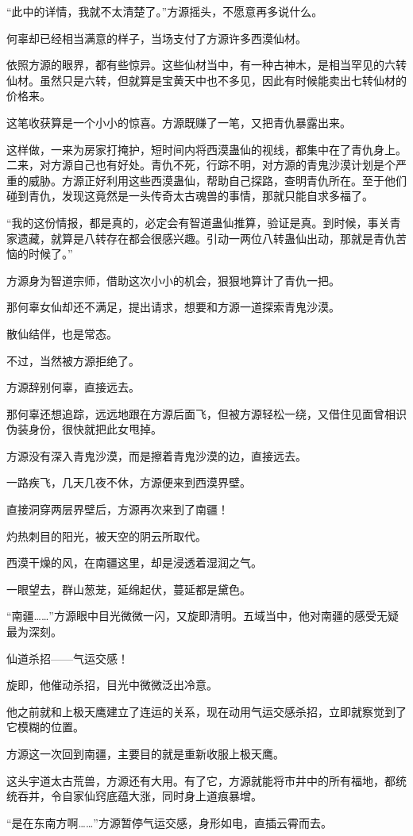 \begin{this_body}
“此中的详情，我就不太清楚了。”方源摇头，不愿意再多说什么。

何辜却已经相当满意的样子，当场支付了方源许多西漠仙材。

依照方源的眼界，都有些惊异。这些仙材当中，有一种古神木，是相当罕见的六转仙材。虽然只是六转，但就算是宝黄天中也不多见，因此有时候能卖出七转仙材的价格来。

这笔收获算是一个小小的惊喜。方源既赚了一笔，又把青仇暴露出来。

这样做，一来为房家打掩护，短时间内将西漠蛊仙的视线，都集中在了青仇身上。二来，对方源自己也有好处。青仇不死，行踪不明，对方源的青鬼沙漠计划是个严重的威胁。方源正好利用这些西漠蛊仙，帮助自己探路，查明青仇所在。至于他们碰到青仇，发现这竟然是一头传奇太古魂兽的事情，那就只能自求多福了。

“我的这份情报，都是真的，必定会有智道蛊仙推算，验证是真。到时候，事关青家遗藏，就算是八转存在都会很感兴趣。引动一两位八转蛊仙出动，那就是青仇苦恼的时候了。”

方源身为智道宗师，借助这次小小的机会，狠狠地算计了青仇一把。

那何辜女仙却还不满足，提出请求，想要和方源一道探索青鬼沙漠。

散仙结伴，也是常态。

不过，当然被方源拒绝了。

方源辞别何辜，直接远去。

那何辜还想追踪，远远地跟在方源后面飞，但被方源轻松一绕，又借住见面曾相识伪装身份，很快就把此女甩掉。

方源没有深入青鬼沙漠，而是擦着青鬼沙漠的边，直接远去。

一路疾飞，几天几夜不休，方源便来到西漠界壁。

直接洞穿两层界壁后，方源再次来到了南疆！

灼热刺目的阳光，被天空的阴云所取代。

西漠干燥的风，在南疆这里，却是浸透着湿润之气。

一眼望去，群山葱茏，延绵起伏，蔓延都是黛色。

“南疆……”方源眼中目光微微一闪，又旋即清明。五域当中，他对南疆的感受无疑最为深刻。

仙道杀招——气运交感！

旋即，他催动杀招，目光中微微泛出冷意。

他之前就和上极天鹰建立了连运的关系，现在动用气运交感杀招，立即就察觉到了它模糊的位置。

方源这一次回到南疆，主要目的就是重新收服上极天鹰。

这头宇道太古荒兽，方源还有大用。有了它，方源就能将市井中的所有福地，都统统吞并，令自家仙窍底蕴大涨，同时身上道痕暴增。

“是在东南方啊……”方源暂停气运交感，身形如电，直插云霄而去。

\end{this_body}

